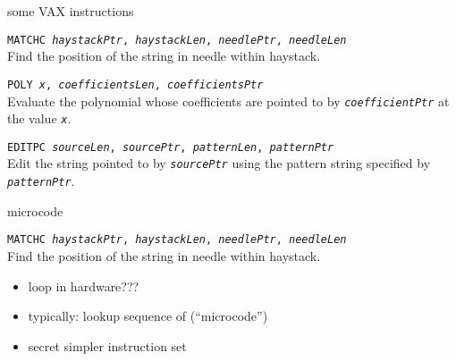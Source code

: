 \begin{frame}[label=VAX]{some VAX instructions}
    \begin{framed}
        \small
        {\tt MATCHC {\sl haystackPtr}, {\sl haystackLen}, {\sl needlePtr}, {\sl needleLen}} \\
        Find the position of the string in needle within haystack.
    \end{framed}
    \begin{framed}
        \small
        {\tt POLY {\sl x}, {\sl coefficientsLen}, {\sl coefficientsPtr}} \\
        Evaluate the polynomial whose coefficients are pointed to by {\tt\sl coefficientPtr}
        at the value {\tt\sl x}.
    \end{framed}
    \begin{framed}
        \small
        {\tt EDITPC {\sl sourceLen}, {\sl sourcePtr}, {\sl patternLen}, {\sl patternPtr}} \\
        Edit the string pointed to by {\tt\sl sourcePtr} using the pattern string specified
        by {\tt\sl patternPtr}. 
    \end{framed}
\end{frame}

\begin{frame}[label=microcode]{microcode}
    \begin{framed}
        \small
        {\tt MATCHC {\sl haystackPtr}, {\sl haystackLen}, {\sl needlePtr}, {\sl needleLen}} \\
        Find the position of the string in needle within haystack.
    \end{framed}
    \begin{itemize}
        \item loop in hardware???
        \item typically: lookup sequence of  (``microcode'')
        \item secret simpler instruction set
    \end{itemize}
\end{frame}
